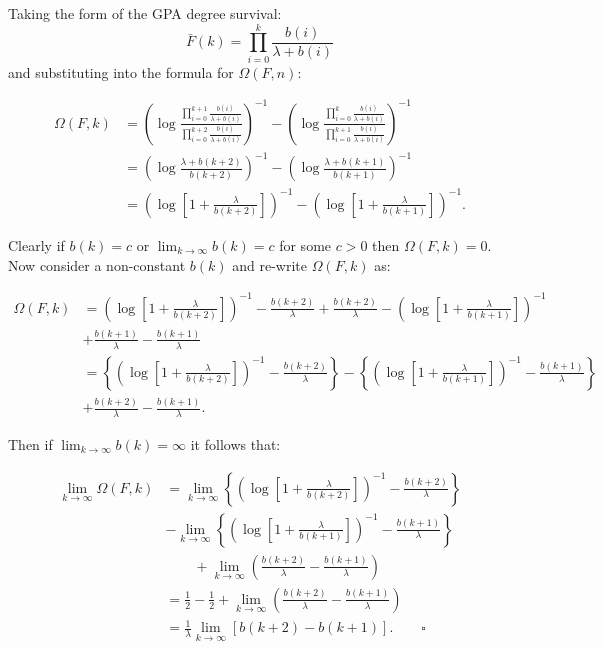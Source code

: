 \documentclass[
  sn-basic,
]{sn-jnl}
\theoremstyle{plain}
\theoremstyle{plain}
\theoremstyle{remark}
\begin{document}
Taking the form of the GPA degree survival: \[
\bar F(k) = \prod_{i=0}^k\frac{b(i)}{\lambda+b(i)}
\] and substituting into the formula for \(\Omega(F,n)\):

\begin{align*}
\Omega(F,k)&=\left(\log\frac{\prod_{i=0}^{k+1}\frac{b(i)}{\lambda+b(i)}}{\prod_{i=0}^{k+2}\frac{b(i)}{\lambda+b(i)}}\right)^{-1}-\left(\log\frac{\prod_{i=0}^{k}\frac{b(i)}{\lambda+b(i)}}{\prod_{i=0}^{k+1}\frac{b(i)}{\lambda+b(i)}}\right)^{-1}\\
&=\left(\log\frac{\lambda+b(k+2)}{b(k+2)}\right)^{-1}-\left(\log\frac{\lambda+b(k+1)}{b(k+1)}\right)^{-1}\\
&=\left(\log\left[1+\frac{\lambda}{b(k+2)}\right]\right)^{-1}-\left(\log\left[1+\frac{\lambda}{b(k+1)}\right]\right)^{-1}.
\end{align*}

Clearly if \(b(k)=c\) or \(\lim_{k\rightarrow\infty}b(k)=c\) for some
\(c>0\) then \(\Omega(F,k)=0\). Now consider a non-constant \(b(k)\) and
re-write \(\Omega(F,k)\) as:

\begin{align*}
\Omega(F,k) &= \left(\log\left[1+\frac{\lambda}{b(k+2)}\right]\right)^{-1}-\frac{b(k+2)}{\lambda}+\frac{b(k+2)}{\lambda}-\left(\log\left[1+\frac{\lambda}{b(k+1)}\right]\right)^{-1}\\&+\frac{b(k+1)}{\lambda}  -\frac{b(k+1)}{\lambda}\\
&=\left\{ \left(\log\left[1+\frac{\lambda}{b(k+2)}\right]\right)^{-1}-\frac{b(k+2)}{\lambda}\right\} - \left\{ \left(\log\left[1+\frac{\lambda}{b(k+1)}\right]\right)^{-1}-\frac{b(k+1)}{\lambda}\right\}\\&+\frac{b(k+2)}{\lambda}-\frac{b(k+1)}{\lambda}.
\end{align*}

Then if \(\lim_{k\rightarrow\infty}b(k)=\infty\) it follows that:

\begin{align*}
\lim_{k\rightarrow\infty}\Omega(F,k) &= \lim_{k\rightarrow\infty}\left\{ \left(\log\left[1+\frac{\lambda}{b(k+2)}\right]\right)^{-1}-\frac{b(k+2)}{\lambda}\right\} \\&- \lim_{k\rightarrow\infty}\left\{ \left(\log\left[1+\frac{\lambda}{b(k+1)}\right]\right)^{-1}-\frac{b(k+1)}{\lambda}\right\}\\
&\qquad+\lim_{k\rightarrow\infty}\left(\frac{b(k+2)}{\lambda}-\frac{b(k+1)}{\lambda}\right)\\
&=\frac{1}{2}-\frac{1}{2} + \lim_{k\rightarrow\infty}\left(\frac{b(k+2)}{\lambda}-\frac{b(k+1)}{\lambda}\right)\\
&=\frac{1}{\lambda}\lim_{k\rightarrow\infty}\left[b(k+2)-b(k+1)\right].\qquad \square
\end{align*}
\end{document}
